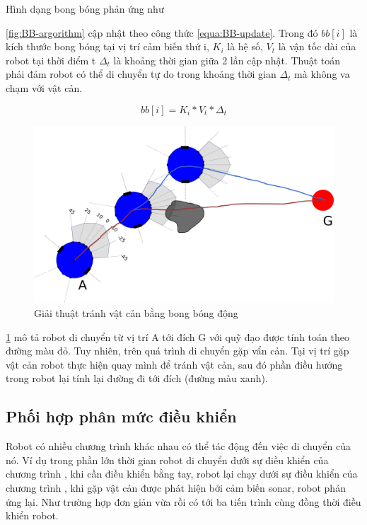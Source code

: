 Hình dạng bong bóng phản ứng như \figurename{\ref{fig:BB-argorithm} cập nhật theo công thức \ref{equa:BB-update}. Trong đó $bb[i]$ là kích thước bong bóng tại vị trí cảm biến thứ i, $K_i$ là hệ số, $V_t$ là vận tốc dài của robot tại thời điểm t $\Delta_t$ là khoảng thời gian giữa 2 lần cập nhật.
Thuật toán phải đảm robot có thể di chuyển tự do trong khoảng thời gian $\Delta_t$ mà không va chạm với vật cản.

\begin{equation}
    bb[i] = K_i*V_t*\Delta_t
    \label{equa:BB-update}
\end{equation}

\begin{figure}[htbp]
    \centering
    \includegraphics[width=\linewidth]{figures/IR_BB-avoidance.png}
    \caption{Giải thuật tránh vật cản bằng bong bóng động}
    \label{fig:BB-avoidance}
\end{figure}

\figurename{\ref{fig:BB-avoidance}} mô tả robot di chuyển từ vị trí A tới đích G với quỹ đạo được tính toán theo đường màu đỏ. Tuy nhiên, trên quá trình di chuyển gặp vẩn cản. Tại vị trí gặp vật cản robot thực hiện quay mình để tránh vật cản, sau đó phần điều hướng trong robot lại tính lại đường đi tới đích (đường màu xanh).

\subsection{Phối hợp phân mức điều khiển}
Robot có nhiều chương trình khác nhau có thể tác động đến việc di chuyển của nó. Ví dụ trong phần lớn thời gian robot di chuyển dưới sự điều khiển của chương trình , khi cần điều khiển bằng tay, robot lại chạy dưới sự điều khiển của chương trình , khi gặp vật cản được phát hiện bởi cảm biến sonar, robot phản ứng lại. Như trường hợp đơn giản vừa rồi có tới ba tiến trình cùng đồng thời điều khiển robot.

}
